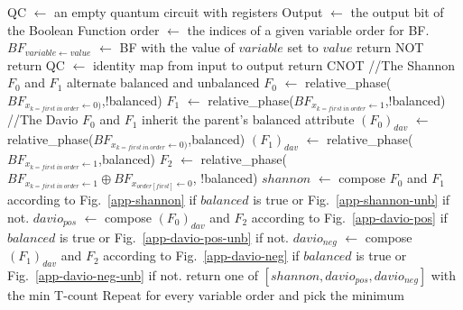 \begin{algorithm}[tb]
  \caption{relative\_phase(BF: a Boolean function, balanced: Boolean indicating whether this function is balanced)}
  \label{algo-new}
  \begin{algorithmic}
    \State QC $\leftarrow$ an empty quantum circuit with registers
    \State Output $\leftarrow$ the output bit of the Boolean Function
    \State order $\leftarrow$ the indices of a given variable order for BF.
    \State $BF_{{variable}\leftarrow value}$ $\leftarrow$ BF with the value of $variable$ set to $value$
    \State return NOT
    \State return QC $\leftarrow$ identity map from input to output
    \State return CNOT
    \Else
    \State    //The Shannon $F_0$ and $F_1$ alternate balanced and unbalanced
    \State    $F_0$ $\leftarrow$ relative\_phase($BF_{x_{k = first\ in\ order}\leftarrow 0)}$,!balanced) 
    \State    $F_1$ $\leftarrow$ relative\_phase($BF_{x_{k = first\ in\ order}\leftarrow 1}$,!balanced) 
    \State
    \State    //The Davio $F_0$ and $F_1$ inherit the parent's balanced attribute
    \State    $(F_0)_{dav}$ $\leftarrow$ relative\_phase($BF_{x_{k = first\ in\ order}\leftarrow 0)}$,balanced) 
    \State    $(F_1)_{dav}$ $\leftarrow$ relative\_phase($BF_{x_{k = first\ in\ order}\leftarrow 1}$,balanced) 
    \State
    \State    $F_2$ $\leftarrow$ relative\_phase($BF_{x_{k = first\ in\ order}\leftarrow 1} \oplus BF_{x_{order[first]}\leftarrow 0}$,
    \State                       !balanced)
    \State
    \State    $shannon$ $\leftarrow$ compose $F_0$ and $F_1$ according to Fig.~\ref{app-shannon}  if $balanced$ is true or Fig.~\ref{app-shannon-unb} if not.
    \State    $davio_{pos}$ $\leftarrow$ compose $(F_0)_{dav}$ and $F_2$ according to Fig.~\ref{app-davio-pos} if $balanced$ is true or Fig.~\ref{app-davio-pos-unb} if not.
    \State    $davio_{neg}$ $\leftarrow$ compose $(F_1)_{dav}$ and $F_2$ according to Fig.~\ref{app-davio-neg} if $balanced$ is true or Fig.~\ref{app-davio-neg-unb} if not.
    \State    return one of $[shannon, davio_{pos},davio_{neg}]$ with the min T-count
    \EndIf
    \State Repeat for every variable order and pick the minimum
  \end{algorithmic}
  
\end{algorithm}


